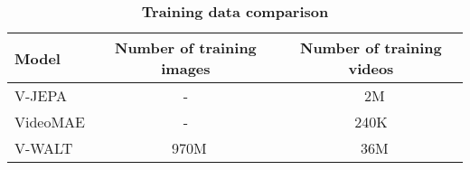 





\begin{table*}[t]
\centering
\begin{tabular}{lcc}
\toprule
Model & Number of training images & Number of training videos \\
\midrule
V-JEPA & - & ~2M \\
VideoMAE & - & 240K \\
V-WALT & ~970M & ~36M \\
\bottomrule
\end{tabular}
\caption{
\textbf{Training data comparison}}
\label{tab:training data}
\end{table*}




